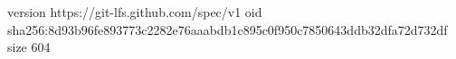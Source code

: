 version https://git-lfs.github.com/spec/v1
oid sha256:8d93b96fe893773c2282e76aaabdb1c895c0f950c7850643ddb32dfa72d732df
size 604
